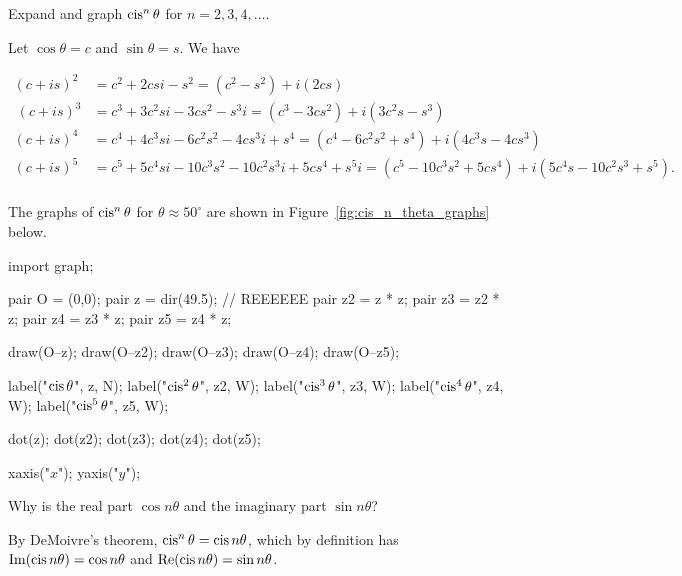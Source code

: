 \documentclass[../key.tex]{subfiles}
\begin{document}
\begin{outer_problem}
\item Expand and graph $\operatorname{cis}^n \theta$ for $n=2,3,4,\ldots$.
\end{outer_problem}

Let $\cos\theta = c$ and $\sin\theta = s$. We have

\begin{align*}
(c+is)^2 &= c^2 + 2csi - s^2 = (c^2 - s^2) + i(2cs) \\\
(c+is)^3 &= c^3 + 3c^2si - 3cs^2 - s^3i = (c^3 - 3cs^2) + i(3c^2s - s^3) \\
(c+is)^4 &= c^4 + 4c^3si - 6c^2s^2 - 4cs^3i + s^4 = (c^4 - 6c^2s^2 + s^4) + i(4c^3s - 4cs^3) \\
(c+is)^5 &= c^5 + 5c^4si - 10c^3s^2 - 10c^2s^3i + 5cs^4 + s^5i = (c^5 - 10c^3s^2 + 5cs^4) + i(5c^4s - 10c^2s^3 + s^5). \\
\end{align*}

The graphs of $\operatorname{cis}^n\theta$ for $\theta \approx 50^\circ$ are shown in Figure~\ref{fig:cis_n_theta_graphs} below.

\begin{center}
\begin{asy}[width=0.4\textwidth]
import graph;

pair O = (0,0);
pair z = dir(49.5); // REEEEEE
pair z2 = z * z;
pair z3 = z2 * z;
pair z4 = z3 * z;
pair z5 = z4 * z;

draw(O--z);
draw(O--z2);
draw(O--z3);
draw(O--z4);
draw(O--z5);

label("$\operatorname{cis} \theta$", z, N);
label("$\operatorname{cis}^2 \theta$", z2, W);
label("$\operatorname{cis}^3 \theta$", z3, W);
label("$\operatorname{cis}^4 \theta$", z4, W);
label("$\operatorname{cis}^5 \theta$", z5, W);

dot(z);
dot(z2);
dot(z3);
dot(z4);
dot(z5);

xaxis("$x$");
yaxis("$y$");
\end{asy}
\label{fig:cis_n_theta_graphs}
\end{center}

\begin{inner_problem}[start=1]
\item Why is the real part $\cos n\theta$ and the imaginary part $\sin n\theta$?
\end{inner_problem}

By DeMoivre's theorem, $\operatorname{cis}^n\theta = \operatorname{cis} n\theta$, which by definition has $\operatorname{Im}(\operatorname{cis} n\theta) = \cos n\theta$ and $\operatorname{Re}(\operatorname{cis} n\theta) = \sin n\theta$.
\end{document}
